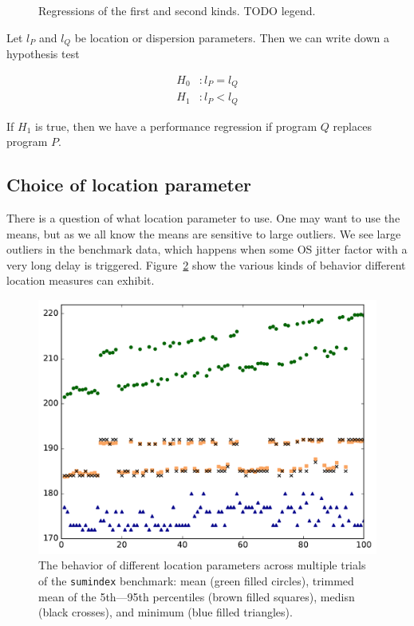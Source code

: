 \documentclass[conference]{IEEEtran}
\begin{document}
\begin{figure}
\centering

\caption{Regressions of the first and second kinds. TODO legend.}
\label{fig:regressionkinds}
\end{figure}

Let $l_P$ and $l_Q$ be location or dispersion parameters. Then we can write down a hypothesis test

\begin{subequations}
\begin{align}
H_0&: l_P = l_Q \\
H_1&: l_P < l_Q
\end{align}
\end{subequations}

If $H_1$ is true, then we have a performance regression if program $Q$ replaces program $P$.


\subsection{Choice of location parameter}

There is a question of what location parameter to use.
One may want to use the means, but as we all know the means are sensitive to large outliers. We see large outliers in the benchmark data, which happens when some OS jitter factor with a very long delay is triggered.
Figure~\ref{fig:locationmeasures} show the various kinds of behavior different location measures can exhibit.

\begin{figure}
\centering
\includegraphics[width=\columnwidth]{figures/fig3/location_estimators_sumindex}
\caption{The behavior of different location parameters across multiple trials of
the \lstinline|sumindex| benchmark: mean (green filled circles), trimmed mean of
the 5th---95th percentiles (brown filled squares), medisn (black crosses), and
minimum (blue filled triangles).}
\label{fig:locationmeasures}
\end{figure}
\end{document}
